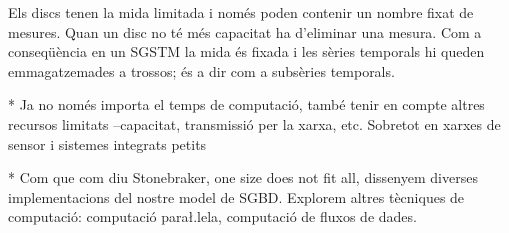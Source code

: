 Els discs tenen la mida limitada i només poden contenir un nombre
fixat de mesures. Quan un disc no té més capacitat ha d'eliminar una
mesura. Com a conseqüència en un SGSTM la mida és fixada i les sèries
temporals hi queden emmagatzemades a trossos; és a dir com a subsèries
temporals.





* Ja no només importa el temps de computació, també tenir en compte altres recursos limitats --capacitat, transmissió per la xarxa, etc. Sobretot en xarxes de sensor i sistemes integrats petits


* Com que com diu Stonebraker, one size does not fit all, dissenyem
diverses implementacions del nostre model de SGBD. Explorem altres
tècniques de computació: computació para\l.lela, computació de fluxos
de dades.
